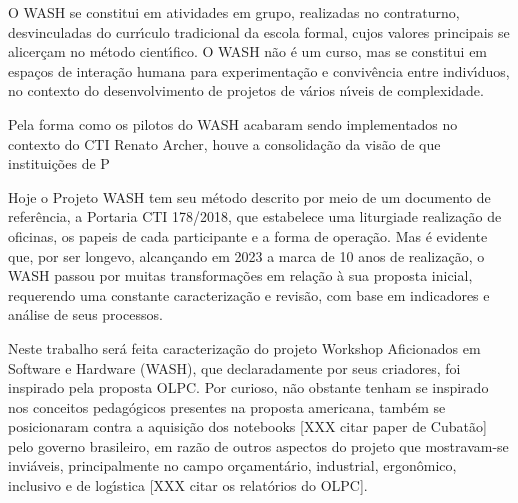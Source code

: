 \documentclass[
12pt,		%
openright,	%
twoside,  %
a4paper,			%
chapter=TITLE,		%
english,			%
french,				%
spanish,			%
brazil				%
]{USPSC-classe/USPSC}
\begin{document}
O WASH se constitui em atividades em grupo, realizadas no contraturno, desvinculadas do curr\'{\i}culo tradicional da escola formal, cujos valores principais se alicer\c{c}am no m\'etodo cient\'{\i}fico. O WASH n\~ao \'e um curso, mas se constitui em espa\c{c}os de intera\c{c}\~ao humana para experimenta\c{c}\~ao e conviv\^encia entre indiv\'{\i}duos, no contexto do desenvolvimento de projetos de v\'arios n\'{\i}veis de complexidade.














Pela forma como os pilotos do WASH acabaram sendo implementados no contexto do CTI Renato Archer, houve a consolida\c{c}\~ao da vis\~ao de que institui\c{c}\~oes de P














Hoje o Projeto WASH tem seu m\'etodo descrito por meio de um documento de refer\^encia, a Portaria CTI 178/2018, que estabelece uma \textquotedbl liturgia de realiza\c{c}\~ao de oficinas, os papeis de cada participante e a forma de opera\c{c}\~ao. Mas \'e evidente que, por ser longevo, alcan\c{c}ando em 2023 a marca de 10 anos de realiza\c{c}\~ao, o WASH passou por muitas transforma\c{c}\~oes em rela\c{c}\~ao \`a sua proposta inicial, requerendo uma constante caracteriza\c{c}\~ao e revis\~ao, com base em indicadores e an\'alise de seus processos.














Neste trabalho ser\'a feita caracteriza\c{c}\~ao do projeto Workshop Aficionados em Software e Hardware (WASH), que declaradamente por seus criadores, foi inspirado pela proposta OLPC. Por curioso, n\~ao obstante tenham se inspirado nos conceitos pedag\'ogicos presentes na proposta americana, tamb\'em se posicionaram contra a aquisi\c{c}\~ao dos notebooks [XXX citar paper de Cubat\~ao] pelo governo brasileiro, em raz\~ao de outros aspectos do projeto que mostravam-se invi\'aveis, principalmente no campo or\c{c}ament\'ario, industrial, ergon\^omico, inclusivo e de log\'{\i}stica [XXX citar os relat\'orios do OLPC].
\end{document}
